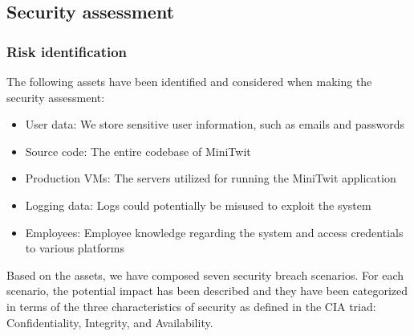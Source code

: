 \subsection{Security assessment}

\subsubsection{Risk identification}

The following assets have been identified and considered when making the security assessment:

\begin{itemize}
    \item User data: We store sensitive user information, such as emails and passwords
    \item Source code: The entire codebase of MiniTwit
    \item Production VMs: The servers utilized for running the MiniTwit application
    \item Logging data: Logs could potentially be misused to exploit the system
    \item Employees: Employee knowledge regarding the system and access credentials to various platforms
\end{itemize}

Based on the assets, we have composed seven security breach scenarios. For each scenario, the potential impact has been described and they have been categorized in terms of the three characteristics of security as defined in the CIA triad: Confidentiality, Integrity, and Availability\cite{bass2003software}. 


